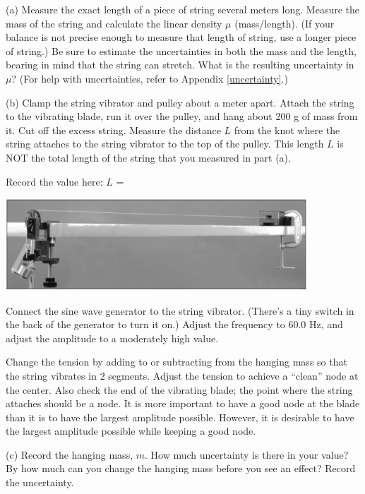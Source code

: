 (a) Measure the exact length of a piece of string several meters long. Measure the mass of the
string and calculate the linear density $\mu$ (mass/length).  (If your balance is not precise enough to measure that length of string, use a longer piece of string.)  Be sure to estimate the uncertainties in both the mass and the length, bearing in mind that the string can stretch. What is the resulting uncertainty in $\mu$?  (For help with uncertainties, refer to Appendix \ref{uncertainty}.)
\answerspace{4cm}

(b) Clamp the string vibrator and pulley about a meter apart. Attach the string to the vibrating blade, run it over the pulley, and hang about 200 g of mass from it. Cut off the excess string. Measure the distance $L$ from the knot where the string attaches to the string vibrator to the top of the pulley.
This length $L$ is NOT the total length of the string that you measured in part (a). 

Record the value here: $L$ =

\vspace{0.3cm}
\begin{center}
\includegraphics[width=320pt]{standing_waves_strings/standing_waves_strings_fig3_tb.eps}
\end{center}
\vspace{0.3cm}

Connect the sine wave generator to the string vibrator. (There's a tiny switch in the back of the generator to turn it on.)  Adjust the frequency to 60.0 Hz, and adjust the amplitude to a moderately high value.

Change the tension by adding to or subtracting from the hanging mass so that the string vibrates in 2 segments. Adjust the tension to achieve a ``clean'' node at the center. Also check the end of the vibrating blade; the point where the string attaches should be a node. It is more important to have a good node at the blade than it is to have the largest amplitude possible. However, it is desirable to have the largest amplitude possible while keeping a good node.

(c) Record the hanging mass, $m$. How much uncertainty is there in your value? By how much can you change the hanging mass before you see an effect? Record the uncertainty.
\answerspace{1cm}

